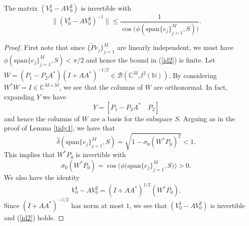 \documentclass[a4paper,10pt]{article}
\begin{document}
\begin{lemma}
\label{tidy2}
The matrix $(V_0^1-AV_0^2)$ is invertible with
\begin{equation}
\label{id2}
\|(V_0^1-AV_0^2)^{-1}\|\leq\frac{1}{\cos\big(\phi(\mathrm{span}\{e_j\}_{j=1}^M,S)\big)}.
\end{equation}
\end{lemma}
\begin{proof}
First note that since $\{\tilde Pe_j\}_{j=1}^M$ are linearly independent, we must have $\phi(\mathrm{span}\{e_j\}_{j=1}^M,S)<\pi/2$ and hence the bound in (\ref{id2}) is finite. Let $W=(P_1-P_2A^*)(I+AA^*)^{-1/2}\in\mathcal{B}(\mathbb{C}^M,l^2(\mathbb{N}))$. By considering $W^*W=I\in\mathbb{C}^{M\times M}$, we see that the columns of $W$ are orthonormal. In fact, expanding $Y$ we have
$$
Y=[P_1-P_2A^* \quad P_2]
$$
and hence the columns of $W$ are a basis for the subspace $S$. Arguing as in the proof of Lemma \ref{tidy1}, we have that
$$
\hat\delta(\mathrm{span}\{e_j\}_{j=1}^M,S)=\sqrt{1-\sigma_0(W^*P_0)^2}<1.
$$
This implies that $W^*P_0$ is invertible with
$$
\sigma_0(W^*P_0)=\cos\big(\phi(\mathrm{span}\{e_j\}_{j=1}^M,S\big)\big)>0.
$$
We also have the identity
$$
V_0^1-AV_0^2=(I+AA^*)^{1/2}(W^*P_0).
$$
Since $(I+AA^*)^{-1/2}$ has norm at most $1$, we see that $(V_0^1-AV_0^2)$ is invertible and (\ref{id2}) holds.
\end{proof}
\end{document}
